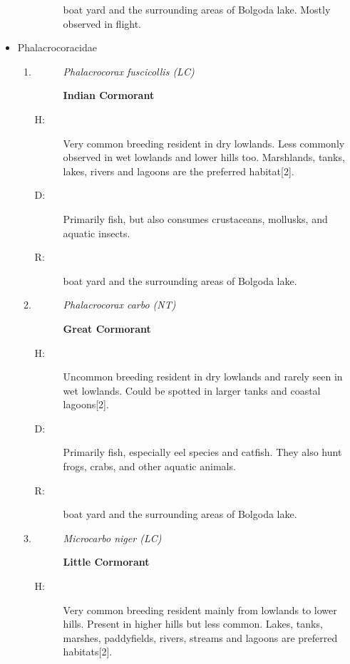 \begin{itemize}
\begin{enumerate}
\begin{description}
boat yard and the surrounding areas of Bolgoda lake. Mostly observed in flight.%
\end{description}%
\end{enumerate}%
\item%
Phalacrocoracidae%
\begin{enumerate}%
\item%
\begin{description}%
\item[]%
\textit{Phalacrocorax fuscicollis (LC)}%
\item[]%
\textbf{Indian Cormorant}%
\end{description}%
\begin{description}%
\item[H: ]%
Very common breeding resident in dry lowlands. Less commonly observed in wet lowlands and lower hills too. Marshlands, tanks, lakes, rivers and lagoons are the preferred habitat{[}2{]}.%
\item[D: ]%
Primarily fish, but also consumes crustaceans, mollusks, and aquatic insects.%
\item[R: ]%
boat yard and the surrounding areas of Bolgoda lake.%
\end{description}%
\item%
\begin{description}%
\item[]%
\textit{Phalacrocorax carbo (NT)}%
\item[]%
\textbf{Great Cormorant}%
\end{description}%
\begin{description}%
\item[H: ]%
Uncommon breeding resident in dry lowlands and rarely seen in wet lowlands. Could be spotted in larger tanks and coastal lagoons{[}2{]}.%
\item[D: ]%
Primarily fish, especially eel species and catfish. They also hunt frogs, crabs, and other aquatic animals.%
\item[R: ]%
boat yard and the surrounding areas of Bolgoda lake.%
\end{description}%
\item%
\begin{description}%
\item[]%
\textit{Microcarbo niger (LC)}%
\item[]%
\textbf{Little Cormorant}%
\end{description}%
\begin{description}%
\item[H: ]%
Very common breeding resident mainly from lowlands to lower hills. Present in higher hills but less common. Lakes, tanks, marshes, paddyfields, rivers, streams and lagoons are preferred habitats{[}2{]}.%

\end{description}
\end{enumerate}
\end{itemize}
